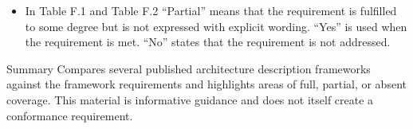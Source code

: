 \documentclass[10pt,letterpaper]{article}
\begin{document}
\begin{CornellNotesTable}
{\begin{itemize}[leftmargin=*,nosep,topsep=1pt]
\item In Table F.1 and Table F.2 “Partial” means that the requirement is fulfilled to some degree but is not expressed with explicit wording. “Yes” is used when the requirement is met. “No” states that the requirement is not addressed.
\end{itemize}}
\end{CornellNotesTable}


\begin{CornellSummaryBox}{Summary}
Compares several published architecture description frameworks against the framework requirements and highlights areas of full, partial, or absent coverage. This material is informative guidance and does not itself create a conformance requirement.
\end{CornellSummaryBox}
\end{document}
